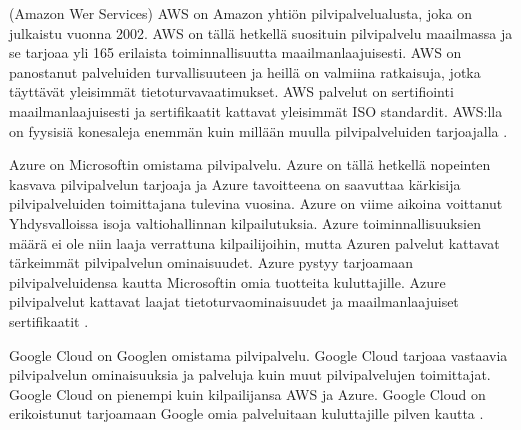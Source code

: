 (Amazon Wer Services) AWS on Amazon yhtiön pilvipalvelualusta, joka on julkaistu vuonna 2002. AWS on tällä hetkellä suosituin pilvipalvelu maailmassa ja se tarjoaa yli 165 erilaista toiminnallisuutta maailmanlaajuisesti. AWS on panostanut palveluiden turvallisuuteen ja heillä on valmiina ratkaisuja, jotka täyttävät yleisimmät tietoturvavaatimukset. AWS palvelut on sertifiointi maailmanlaajuisesti ja sertifikaatit kattavat yleisimmät ISO standardit. AWS:lla on fyysisiä konesaleja enemmän kuin millään muulla pilvipalveluiden tarjoajalla \citep{top_cloud}.

Azure on Microsoftin omistama pilvipalvelu. Azure on tällä hetkellä nopeinten kasvava pilvipalvelun tarjoaja ja Azure tavoitteena on saavuttaa kärkisija pilvipalveluiden toimittajana tulevina vuosina. Azure on viime aikoina voittanut Yhdysvalloissa isoja valtiohallinnan kilpailutuksia. Azure toiminnallisuuksien määrä ei ole niin laaja verrattuna kilpailijoihin, mutta Azuren palvelut kattavat tärkeimmät pilvipalvelun ominaisuudet. Azure pystyy tarjoamaan pilvipalveluidensa kautta Microsoftin omia tuotteita kuluttajille. Azure pilvipalvelut kattavat laajat tietoturvaominaisuudet ja maailmanlaajuiset sertifikaatit \citep{top_cloud}.

Google Cloud on Googlen omistama pilvipalvelu. Google Cloud tarjoaa vastaavia pilvipalvelun ominaisuuksia ja palveluja kuin muut pilvipalvelujen toimittajat. Google Cloud on pienempi kuin kilpailijansa AWS ja Azure. Google Cloud on erikoistunut tarjoamaan Google omia palveluitaan kuluttajille pilven kautta \citep{top_cloud}.
